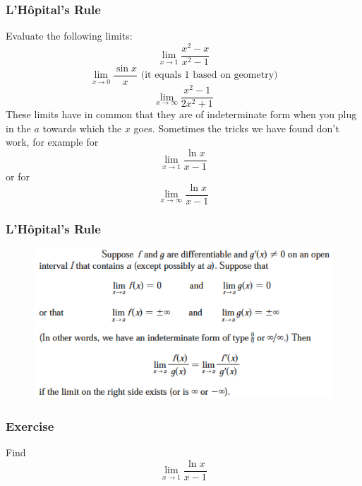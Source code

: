 \documentclass[xcolor=dvipsnames]{beamer}
\begin{document}
\begin{frame}
  \frametitle{L'H{\^o}pital's Rule}
Evaluate the following limits:
\begin{equation}
  \label{eq:ohjishah}
  \lim_{x\rightarrow{}1}\frac{x^{2}-x}{x^{2}-1}
\end{equation}
\begin{equation}
  \label{eq:eighahth}
  \lim_{x\rightarrow{}0}\frac{\sin{}x}{x}\mbox{ (it equals 1 based on geometry)}
\end{equation}
\begin{equation}
  \label{eq:aiwohmae}
  \lim_{x\rightarrow\infty}\frac{x^{2}-1}{2x^{2}+1}
\end{equation}
These limits have in common that they are of \alert{indeterminate
  form} when you plug in the $a$ towards which the $x$ goes. Sometimes
the tricks we have found don't work, for example for
\begin{equation}
  \label{eq:jechuith}
  \lim_{x\rightarrow{}1}\frac{\ln{}x}{x-1}
\end{equation}
or for
\begin{equation}
  \label{eq:ieghaegh}
  \lim_{x\rightarrow{}\infty}\frac{\ln{}x}{x-1}
\end{equation}
\end{frame}

\begin{frame}
  \frametitle{L'H{\^o}pital's Rule}
\begin{figure}[h]
\includegraphics[scale=.6]{./diagrams/lhopital_ed.png}
\end{figure}
\end{frame}

\begin{frame}
  \frametitle{Exercise}
{\ubung} Find
\begin{equation}
  \label{eq:aimooshi}
  \lim_{x\rightarrow{}1}\frac{\ln{}x}{x-1}
\end{equation}
\end{frame}
\end{document}
